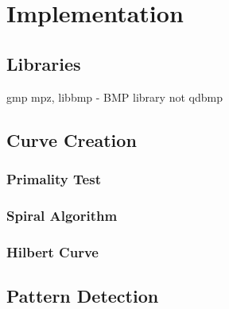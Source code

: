 \section{Implementation}
\label{sec:implementation}
\subsection{Libraries}
gmp mpz, libbmp - BMP library not qdbmp

\subsection{Curve Creation}
\subsubsection{Primality Test}
\subsubsection{Spiral Algorithm}
\subsubsection{Hilbert Curve}

\subsection{Pattern Detection}







